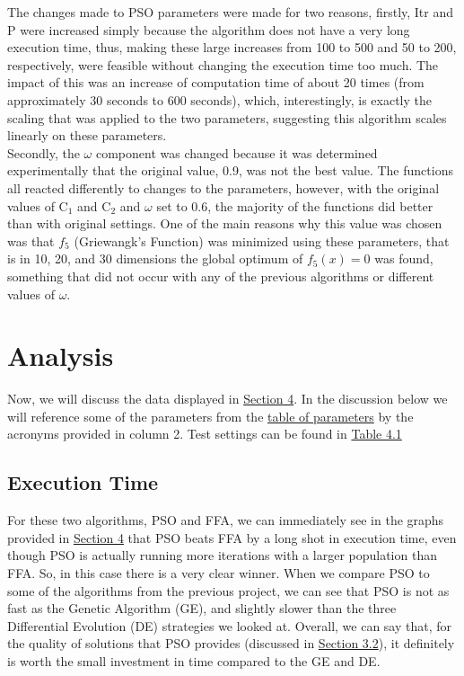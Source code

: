 \documentclass[paper=a4, fontsize=11pt]{scrartcl} %
\numberwithin{equation}{section} %
\numberwithin{figure}{section} %
\numberwithin{table}{section} %
\begin{document}
	 The changes made to PSO parameters were made for two reasons, firstly, Itr and P were increased simply because the algorithm does not have a very long execution time, thus, making these large increases from 100 to 500 and 50 to 200, respectively, were feasible without changing the execution time too much. The impact of this was an increase of computation time of about 20 times (from approximately 30 seconds to 600 seconds), which, interestingly, is exactly the scaling that was applied to the two parameters, suggesting this algorithm scales linearly on these parameters. \\
	 Secondly, the $\omega$ component was changed because it was determined experimentally that the original value, 0.9, was not the best value. The functions all reacted differently to changes to the parameters, however, with the original values of C$_1$ and C$_2$ and $\omega$ set to 0.6, the majority of the functions did better than with original settings. One of the main reasons why this value was chosen was that $f_5$ (Griewangk's Function) was minimized using these parameters, that is in 10, 20, and 30 dimensions the global optimum of $f_5(x) = 0$ was found, something that did not occur with any of the previous algorithms or different values of $\omega$.
	 	 
	
\section{Analysis} \label{S3}
	Now, we will discuss the data displayed in \hyperref[S4]{Section 4}. In the discussion below we will reference some of the parameters from the \hyperref[T21]{table of parameters} by the acronyms provided in column 2. Test settings can be found in \hyperref[T41]{Table 4.1} \\
	
	\subsection{Execution Time} \label{S31}
		For these two algorithms, PSO and FFA, we can immediately see in the graphs provided in \hyperref[S4]{Section 4} that PSO beats FFA by a long shot in execution time, even though PSO is actually running more iterations with a larger population than FFA. So, in this case there is a very clear winner. When we compare PSO to some of the algorithms from the previous project, we can see that PSO is not as fast as the Genetic Algorithm (GE), and slightly slower than the three Differential Evolution (DE) strategies we looked at. Overall, we can say that, for the quality of solutions that PSO provides (discussed in \hyperref[S32]{Section 3.2}), it definitely is worth the small investment in time compared to the GE and DE.
		
\end{document}
